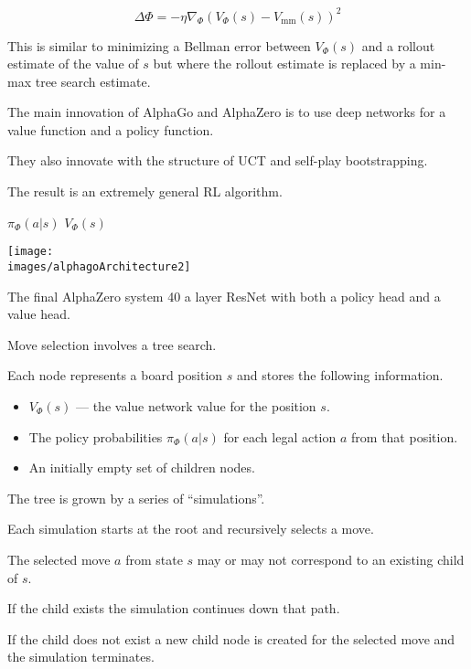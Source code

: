 {\vfill
$$\Delta \Phi = - \eta \nabla_\Phi \left(V_\Phi(s) - V_{\mathrm{mm}}(s)\right)^2$$

\vfill
This is similar to minimizing a Bellman error between $V_\Phi(s)$ and a rollout estimate of the value of $s$ but where the rollout
estimate is replaced by a min-max tree search estimate.



The main innovation of AlphaGo and AlphaZero is to use deep networks for a value function and a policy function.

\vfill
They also innovate with the structure of UCT and self-play bootstrapping.

\vfill
The result is an extremely general RL algorithm.


\centerline{$\pi_\Phi(a|s)$ \hspace{.5in} $V_\Phi(s)$}
\centerline{\texttt{[image: \\images/alphagoArchitecture2]}}

\vfill
The final AlphaZero system 40 a layer ResNet with both a policy head and a value head.


Move selection involves a tree search.

\vfill
Each node represents a board position $s$ and stores the following information.

\vfill
\begin{itemize}
\item $V_\Phi(s)$ --- the value network value for the position $s$.
\vfill
\item The policy probabilities $\pi_\Phi(a|s)$ for each legal action $a$
from that position.
\vfill
\item An initially empty set of children nodes.
\end{itemize}



\vfill
The tree is grown by a series of ``simulations''.

\vfill
Each simulation starts at the root and recursively selects a move.

\vfill
The selected move $a$ from state $s$ may or may not correspond to an existing child of $s$.

\vfill
If the child exists the simulation continues down that path.

\vfill
If the child does not exist a new child node is created for the selected move and the simulation terminates.

}
